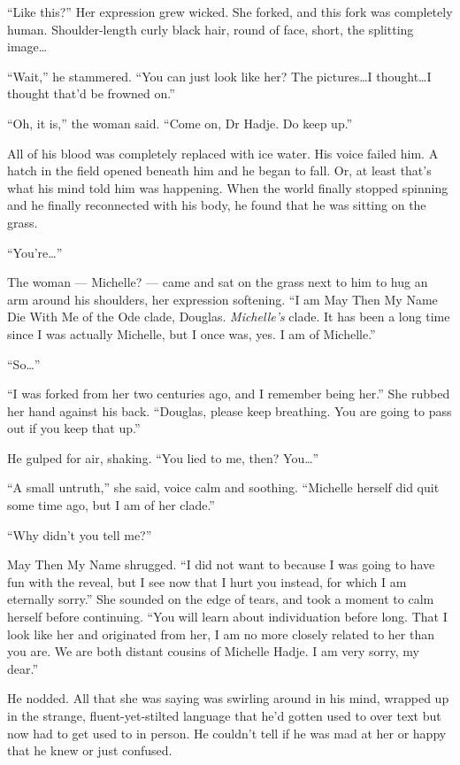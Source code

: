 ``Like this?'' Her expression grew wicked. She forked, and this fork was completely human. Shoulder-length curly black hair, round of face, short, the splitting image\ldots{}

``Wait,'' he stammered. ``You can just look like her? The pictures\ldots I thought\ldots I thought that'd be frowned on.''

``Oh, it is,'' the woman said. ``Come on, Dr Hadje. Do keep up.''

All of his blood was completely replaced with ice water. His voice failed him. A hatch in the field opened beneath him and he began to fall. Or, at least that's what his mind told him was happening. When the world finally stopped spinning and he finally reconnected with his body, he found that he was sitting on the grass.

``You're\ldots{}''

The woman — Michelle? — came and sat on the grass next to him to hug an arm around his shoulders, her expression softening. ``I am May Then My Name Die With Me of the Ode clade, Douglas. \emph{Michelle's} clade. It has been a long time since I was actually Michelle, but I once was, yes. I am of Michelle.''

``So\ldots{}''

``I was forked from her two centuries ago, and I remember being her.'' She rubbed her hand against his back. ``Douglas, please keep breathing. You are going to pass out if you keep that up.''

He gulped for air, shaking. ``You lied to me, then? You\ldots{}''

``A small untruth,'' she said, voice calm and soothing. ``Michelle herself did quit some time ago, but I am of her clade.''

``Why didn't you tell me?''

May Then My Name shrugged. ``I did not want to because I was going to have fun with the reveal, but I see now that I hurt you instead, for which I am eternally sorry.'' She sounded on the edge of tears, and took a moment to calm herself before continuing. ``You will learn about individuation before long. That I look like her and originated from her, I am no more closely related to her than you are. We are both distant cousins of Michelle Hadje. I am very sorry, my dear.''

He nodded. All that she was saying was swirling around in his mind, wrapped up in the strange, fluent-yet-stilted language that he'd gotten used to over text but now had to get used to in person. He couldn't tell if he was mad at her or happy that he knew or just confused.

